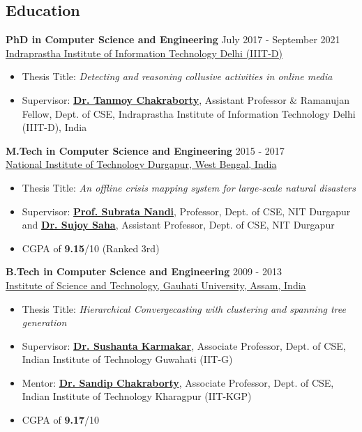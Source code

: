 \documentclass[margin, centered,lmodern]{res}
\begin{document}
\begin{resume}
\section{Education}
\textbf{PhD in Computer Science and Engineering} \hfill July 2017 - September 2021 \\
\href{http://www.iiitd.ac.in/}{Indraprastha Institute of Information Technology Delhi (IIIT-D)}
\begin{itemize}
 \item Thesis Title: \textit{Detecting and reasoning collusive activities in online media}
 \item Supervisor: \href{https://sites.google.com/site/tanmoychakra88/}{\textbf{Dr. Tanmoy Chakraborty}}, Assistant Professor \& Ramanujan Fellow, Dept. of CSE, Indraprastha Institute of Information Technology Delhi (IIIT-D), India
\end{itemize}
\textbf{M.Tech in Computer Science and Engineering} \hfill 2015 - 2017 \\
\href{http://www.nitdgp.ac.in/}{National Institute of Technology Durgapur, West Bengal, India}
\begin{itemize}
 \item Thesis Title: \textit{An offline crisis mapping system for large-scale natural disasters}
 \item Supervisor: \href{http://www.nitdgp.ac.in/cse/s_nandi/s_nandi.php}{\textbf{Prof. Subrata Nandi}}, Professor, Dept. of CSE, NIT Durgapur and \href{http://www.nitdgp.ac.in/cse/s_saha/s_saha.php}{\textbf{Dr. Sujoy Saha}}, Assistant Professor, Dept. of CSE, NIT Durgapur
 \item CGPA of \textbf{9.15}/10 (Ranked 3rd)
\end{itemize}
\textbf{B.Tech in Computer Science and Engineering} \hfill 2009 - 2013 \\
\href{http://www.gauhati.ac.in/}{Institute of Science and Technology, Gauhati University, Assam, India}
\begin{itemize}
 \item Thesis Title: \textit{Hierarchical Convergecasting with clustering and spanning tree generation}
 \item Supervisor: \href{https://www.iitg.ac.in/sushantak/}{\textbf{Dr. Sushanta Karmakar}}, Associate Professor, Dept. of CSE, Indian Institute of Technology Guwahati (IIT-G)
 \item Mentor: \href{http://cse.iitkgp.ac.in/~sandipc/}{\textbf{Dr. Sandip Chakraborty}}, Associate Professor, Dept. of CSE, Indian Institute of Technology Kharagpur (IIT-KGP)
 \item CGPA of \textbf{9.17}/10
\end{itemize}
 

\end{resume}
\end{document}
